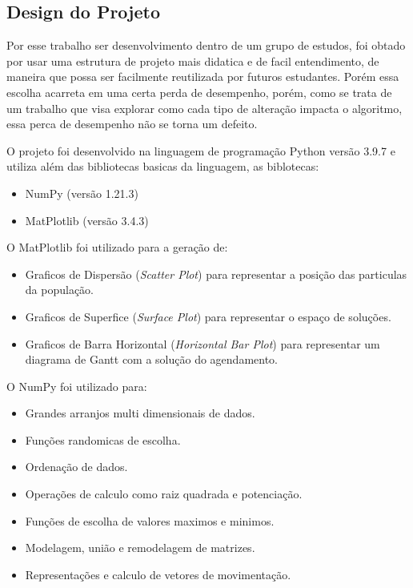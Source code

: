     \subsection{Design do Projeto}
        Por esse trabalho ser desenvolvimento dentro de um grupo de estudos, foi obtado por usar uma estrutura de projeto mais didatica e de facil entendimento, de maneira que possa ser facilmente reutilizada por futuros estudantes. Porém essa escolha acarreta em uma certa perda de desempenho, porém, como se trata de um trabalho que visa explorar como cada tipo de alteração impacta o algoritmo, essa perca de desempenho não se torna um defeito.\newline
        
        O projeto foi desenvolvido na linguagem de programação Python versão 3.9.7 e utiliza além das bibliotecas basicas da linguagem, as biblotecas:
        \begin{itemize}
            \item NumPy (versão 1.21.3)
            \item MatPlotlib (versão 3.4.3)
        \end{itemize}

        \noindent O MatPlotlib foi utilizado para a geração de: 
        \begin{itemize}
            \item Graficos de Dispersão (\textit{Scatter Plot}) para representar a posição das particulas da população.
            \item Graficos de Superfice (\textit{Surface Plot}) para representar o espaço de soluções.
            \item Graficos de Barra Horizontal (\textit{Horizontal Bar Plot}) para representar um diagrama de Gantt com a solução do agendamento.
        \end{itemize}

        \noindent O NumPy foi utilizado para: 
        \begin{itemize}
            \item Grandes arranjos multi dimensionais de dados. 
            \item Funções randomicas de escolha.
            \item Ordenação de dados.
            \item Operações de calculo como raiz quadrada e potenciação.
            \item Funções de escolha de valores maximos e minimos.
            \item Modelagem, união e remodelagem de matrizes.
            \item Representações e calculo de vetores de movimentação.
        \end{itemize}
        
